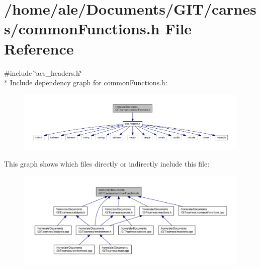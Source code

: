 \hypertarget{a00070}{\section{/home/ale/\-Documents/\-G\-I\-T/carness/common\-Functions.h File Reference}
\label{a00070}
}
{\ttfamily \#include \char`\"{}acs\-\_\-headers.\-h\char`\"{}}\\*
Include dependency graph for common\-Functions.\-h\-:\nopagebreak
\begin{figure}[H]
\begin{center}
\leavevmode
\includegraphics[width=350pt]{a00124}
\end{center}
\end{figure}
This graph shows which files directly or indirectly include this file\-:\nopagebreak
\begin{figure}[H]
\begin{center}
\leavevmode
\includegraphics[width=350pt]{a00125}
\end{center}
\end{figure}

